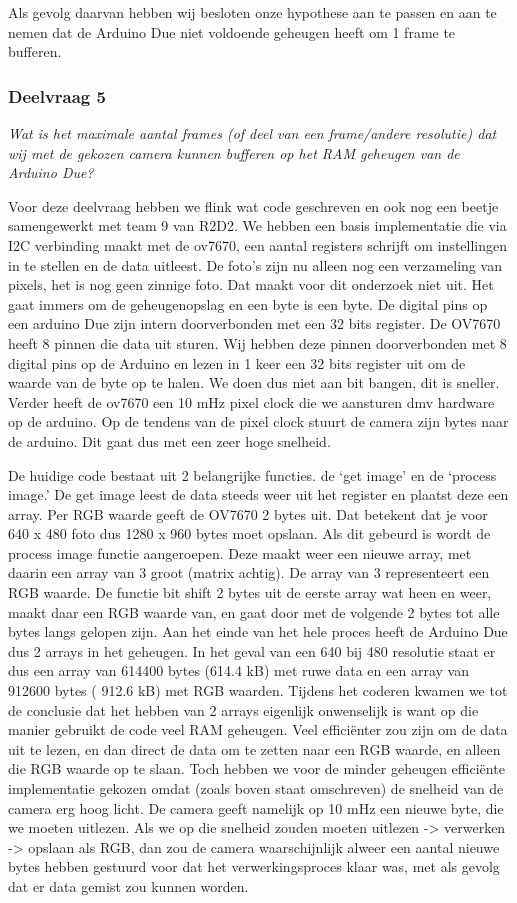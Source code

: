 \documentclass{article}
\begin{document}
Als gevolg daarvan hebben wij besloten onze hypothese aan te passen en aan te nemen dat de Arduino Due niet voldoende geheugen heeft om 1 frame te bufferen. 


\subsubsection{Deelvraag 5}
\textit{Wat is het maximale aantal frames (of deel van een frame/andere resolutie) dat wij met de gekozen camera kunnen bufferen op het RAM geheugen van de Arduino Due?  }

Voor deze deelvraag hebben we flink wat code geschreven en ook nog een beetje samengewerkt met team 9 van R2D2. We hebben een basis implementatie die via I2C verbinding maakt met de ov7670, een aantal registers schrijft om instellingen in te stellen en de data uitleest. De foto’s zijn nu alleen nog een verzameling van pixels, het is nog geen zinnige foto. Dat maakt voor dit onderzoek niet uit. Het gaat immers om de geheugenopslag en een byte is een byte.
De digital pins op een arduino Due zijn intern doorverbonden met een 32 bits register. De OV7670 heeft 8 pinnen die data uit sturen. Wij hebben deze pinnen doorverbonden met 8 digital pins op de Arduino en lezen in 1 keer een 32 bits register uit om de waarde van de byte op te halen. We doen dus niet aan bit bangen, dit is sneller. Verder heeft de ov7670 een 10 mHz pixel clock die we aansturen dmv hardware op de arduino. Op de tendens van de pixel clock stuurt de camera zijn bytes naar de arduino. Dit gaat dus met een zeer hoge snelheid.

De huidige code bestaat uit 2 belangrijke functies. de ‘get image’ en de ‘process image.’ De get image leest de data steeds weer uit het register en plaatst deze een array. Per RGB waarde geeft de OV7670 2 bytes uit. Dat betekent dat je voor 640 x 480 foto dus 1280 x 960 bytes moet opslaan.
Als dit gebeurd is wordt de process image functie aangeroepen. Deze maakt weer een nieuwe array, met daarin een array van 3 groot (matrix achtig). De array van 3 representeert een RGB waarde. De functie bit shift 2 bytes uit de eerste array wat heen en weer, maakt daar een RGB waarde van, en gaat door met de volgende 2 bytes tot alle bytes langs gelopen zijn.
Aan het einde van het hele proces heeft de Arduino Due dus 2 arrays in het geheugen. In het geval van een 640 bij 480 resolutie staat er dus een array van 614400 bytes (614.4 kB) met ruwe data en een array van 912600 bytes ( 912.6 kB) met RGB waarden. 
Tijdens het coderen kwamen we tot de conclusie dat het hebben van 2 arrays eigenlijk onwenselijk is want op die manier gebruikt de code veel RAM geheugen. Veel efficiënter zou zijn om de data uit te lezen, en dan direct de data om te zetten naar een RGB waarde, en alleen die RGB waarde op te slaan. Toch hebben we voor de minder geheugen efficiënte implementatie gekozen omdat (zoals boven staat omschreven) de snelheid van de camera erg hoog licht. De camera geeft namelijk op 10 mHz een nieuwe byte, die we moeten uitlezen. Als we op die snelheid zouden moeten uitlezen -> verwerken -> opslaan als RGB, dan zou de camera waarschijnlijk alweer een aantal nieuwe bytes hebben gestuurd voor dat het verwerkingsproces klaar was, met als gevolg dat er data gemist zou kunnen worden. 
\end{document}
